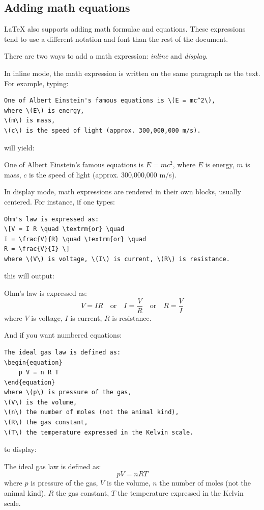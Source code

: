 \documentclass[en,inscr,ack,preface]{dimscthesis}
\begin{document}
\subsection{Adding math equations} \label{adding_math_equations}

\LaTeX{} also supports adding math formulae and equations.
These expressions tend to use a different notation and font than the rest of the document.

There are two ways to add a math expression: \emph{inline} and \emph{display}.

In inline mode, the math expression is written on the same paragraph as the text.
For example, typing:
\begin{verbatim}
One of Albert Einstein's famous equations is \(E = mc^2\),
where \(E\) is energy,
\(m\) is mass,
\(c\) is the speed of light (approx. 300,000,000 m/s).
\end{verbatim}

will yield:

One of Albert Einstein's famous equations is \(E = mc^2\),
where \(E\) is energy,
\(m\) is mass,
\(c\) is the speed of light (approx. 300,000,000 m/s).

In display mode, math expressions are rendered in their own blocks, usually centered.
For instance, if one types:
\begin{verbatim}
Ohm's law is expressed as:
\[V = I R \quad \textrm{or} \quad
I = \frac{V}{R} \quad \textrm{or} \quad
R = \frac{V}{I} \]
where \(V\) is voltage, \(I\) is current, \(R\) is resistance.
\end{verbatim}

this will output:

Ohm's law is expressed as:
\[V = I R \quad \textrm{or} \quad
I = \frac{V}{R} \quad \textrm{or} \quad
R = \frac{V}{I} \]
where \(V\) is voltage, \(I\) is current, \(R\) is resistance.

And if you want numbered equations:
\begin{verbatim}
The ideal gas law is defined as:
\begin{equation}
    p V = n R T
\end{equation}
where \(p\) is pressure of the gas,
\(V\) is the volume,
\(n\) the number of moles (not the animal kind),
\(R\) the gas constant,
\(T\) the temperature expressed in the Kelvin scale.
\end{verbatim}

to display:

The ideal gas law is defined as:
\begin{equation}
    p V = n R T
\end{equation}
where \(p\) is pressure of the gas,
\(V\) is the volume,
\(n\) the number of moles (not the animal kind),
\(R\) the gas constant,
\(T\) the temperature expressed in the Kelvin scale.
\end{document}
